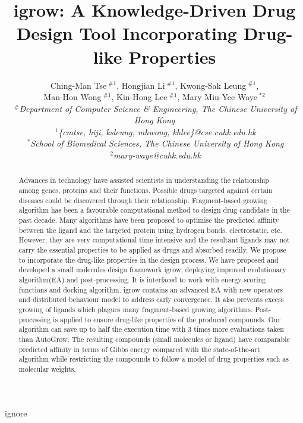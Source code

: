 \documentclass[10pt,conference,letterpaper]{IEEEtran}
\title{igrow: A Knowledge-Driven Drug Design Tool Incorporating Drug-like Properties}
\author{%
{Ching-Man Tse{\small $~^{\#1}$}, Hongjian Li{\small $~^{\#1}$}, Kwong-Sak Leung{\small $~^{\#1}$},}\\ Man-Hon Wong{\small $~^{\#1}$}, Kin-Hong Lee{\small $~^{\#1}$}, {Mary Miu-Yee Waye{\small $~^{*2}$} }%
\vspace{1.6mm}\\
\fontsize{10}{10}\selectfont\itshape
$~^{\#}$Department of Computer Science \& Engineering, The Chinese University of Hong Kong\\
\fontsize{9}{9}\selectfont\ttfamily\upshape
$~^{1}$\{cmtse, hiji, ksleung, mhwong, khlee\}@cse.cuhk.edu.hk
\vspace{1.2mm}\\
\fontsize{10}{10}\selectfont\rmfamily\itshape
$~^{*}$School of Biomedical Sciences, The Chinese University of Hong Kong\\
\fontsize{9}{9}\selectfont\ttfamily\upshape
$~^{2}$mary-waye@cuhk.edu.hk
}
\begin{document}
\maketitle
{}
%
\begin{abstract}
Advances in technology have assisted scientists in understanding the relationship among genes, proteins and their functions.
Possible drugs targeted against certain diseases could be discovered through their relationship.
Fragment-based growing algorithm has been a favourable computational method to design drug candidate in the past decade.
Many algorithms have been proposed to optimise the predicted affinity between the ligand and the targeted protein using hydrogen bonds, electrostatic, etc.
However, they are very computational time intensive and the resultant ligands may not carry the essential properties to be applied as drugs and absorbed readily.
We propose to incorporate the drug-like properties in the design process.
We have proposed and developed a small molecules design framework igrow, deploying improved evolutionary algorithm(EA) and post-processing.
It is interfaced to work with energy scoring functions and docking algorithm.
igrow contains an advanced EA with new operators and distributed behaviour model to address early convergence.
It also prevents excess growing of ligands which plagues many fragment-based growing algorithms.
Post-processing is applied to ensure drug-like properties of the produced compounds.
Our algorithm can save up to half the execution time with 3 times more evaluations taken than AutoGrow.
The resulting compounds (small molecules or ligand) have comparable predicted affinity in terms of Gibbs energy compared with the state-of-the-art algorithm while restricting the compounds to follow a model of drug properties such as molecular weights.
\end{abstract}

\begin{keywords}
ignore
\end{keywords}
%
\end{document}

